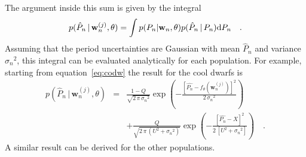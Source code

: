 \documentclass[useAMS, usenatbib]{mn2e}
\newcommand{\logg}{log \emph{g}}
\newcommand{\w}{\mathbf{w}}
\begin{document}
The argument inside this sum is given by the integral
\begin{equation}
p(\hat{P}_n\,|\,\mathbf{w}_n^{(j)},\theta) =
    \int p(P_n|\w_n,\theta) p(\hat{P}_n\,|\,P_n) {\rm d}P_n \quad.
\end{equation}
Assuming that the period uncertainties are Gaussian with mean $\hat{P}_n$
and variance ${\sigma_n}^2$, this integral can be evaluated analytically for
each population.
For example, starting from equation~\ref{eq:codw} the result for the cool
dwarfs is
\begin{eqnarray}
p(\hat{P}_n\,|\,\mathbf{w}_n^{(j)},\theta) &=&
    \frac{1-Q}{\sqrt{2\,\pi\,{\sigma_n}^2}} \exp\left( -
        \frac{\left[\hat{P_n} - f_\theta (\w_n^{(j)}) \right] ^2}
             {2\,{\sigma_n}^2}\right) \nonumber\\
    && +
    \frac{Q}{\sqrt{2\,\pi\,(U^2 + {\sigma_n}^2)}} \exp\left( -
        \frac{[\hat{P_n} - X] ^2}{2\,[U^2 + {\sigma_n}^2]}\right) \quad.
\end{eqnarray}
A similar result can be derived for the other populations.

\end{document}
